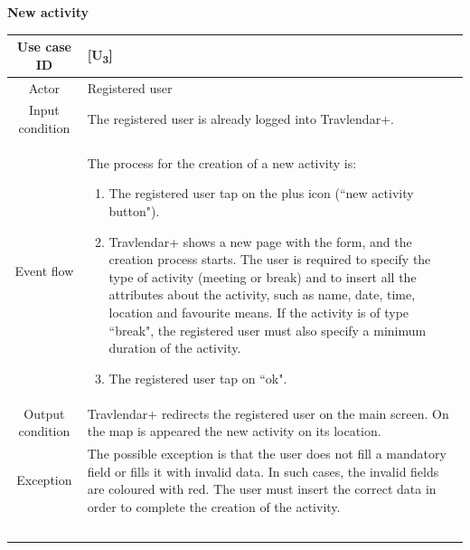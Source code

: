 \documentclass[12pt,titlepage]{article}
\begin{document}
\clearpage
\newpage
 
\begin{flushleft}
\textbf{New activity}
\end{flushleft}


\begin{tabular}{cp{10cm}} 
Use case ID& {[U\textsubscript{3}]}\\ \hline
Actor&Registered user\\ \hline 
Input condition&The registered user is already logged into Travlendar+.\\ \hline
Event flow&The process for the creation of a new activity is: \begin{enumerate}
\item The registered user tap on the plus icon (``new activity button").
\item Travlendar+ shows a new page with the form, and the creation process starts. The user is required to specify the type of activity (meeting or break) and to insert all the attributes about the activity, such as name, date, time, location and favourite means. If the activity is of type ``break", the registered user must also specify a minimum duration of the activity.
\item The registered user tap on ``ok".
\end{enumerate} \\ \hline
Output condition& Travlendar+ redirects the registered user on the main screen. On the map is appeared the new activity on its location. 
\\ \hline
Exception& The possible exception is that the user does not fill a mandatory field or fills it with invalid data. In such cases, the invalid fields are coloured with red. The user must insert the correct data in order to complete the creation of the activity.

\\ \hline \

\end{tabular}
\pagebreak
\end{document}
